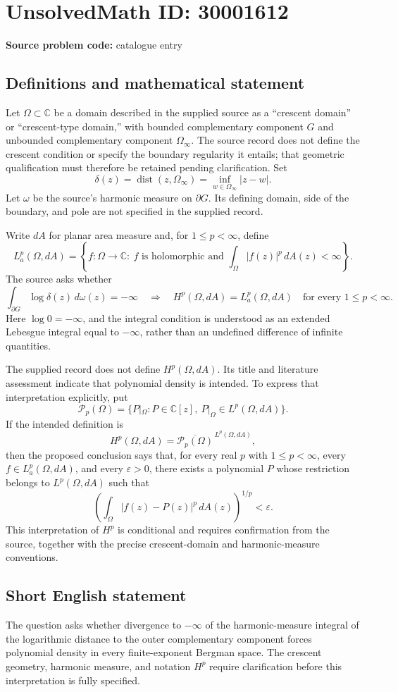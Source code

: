 \documentclass[11pt]{article}
\newcommand{\C}{\mathbb{C}}
\begin{document}
\section*{UnsolvedMath ID: 30001612}
\textbf{Source problem code:} catalogue entry
\subsection{Definitions and mathematical statement}
Let \(\Omega\subset\C\) be a domain described in the supplied source as a ``crescent domain'' or ``crescent-type domain,'' with bounded complementary component \(G\) and unbounded complementary component \(\Omega_\infty\). The source record does not define the crescent condition or specify the boundary regularity it entails; that geometric qualification must therefore be retained pending clarification. Set
\[
\delta(z)=\operatorname{dist}(z,\Omega_\infty)
=\inf_{w\in\Omega_\infty}|z-w|.
\]
Let \(\omega\) be the source's harmonic measure on \(\partial G\). Its defining domain, side of the boundary, and pole are not specified in the supplied record.

Write \(dA\) for planar area measure and, for \(1\leq p<\infty\), define
\[
L_a^p(\Omega,dA)=\left\{f:\Omega\to\C:\ f\text{ is holomorphic and }\int_\Omega |f(z)|^p\,dA(z)<\infty\right\}.
\]
The source asks whether
\[
\int_{\partial G}\log\delta(z)\,d\omega(z)=-\infty
\quad\Longrightarrow\quad
H^p(\Omega,dA)=L_a^p(\Omega,dA)
\quad\text{for every }1\leq p<\infty.
\]
Here \(\log 0=-\infty\), and the integral condition is understood as an extended Lebesgue integral equal to \(-\infty\), rather than an undefined difference of infinite quantities.

The supplied record does not define \(H^p(\Omega,dA)\). Its title and literature assessment indicate that polynomial density is intended. To express that interpretation explicitly, put
\[
\mathcal P_p(\Omega)=\{P|_\Omega:P\in\C[z],\ P|_\Omega\in L^p(\Omega,dA)\}.
\]
If the intended definition is
\[
H^p(\Omega,dA)=\overline{\mathcal P_p(\Omega)}^{\,L^p(\Omega,dA)},
\]
then the proposed conclusion says that, for every real \(p\) with \(1\leq p<\infty\), every \(f\in L_a^p(\Omega,dA)\), and every \(\varepsilon>0\), there exists a polynomial \(P\) whose restriction belongs to \(L^p(\Omega,dA)\) such that
\[
\left(\int_\Omega |f(z)-P(z)|^p\,dA(z)\right)^{1/p}<\varepsilon.
\]
This interpretation of \(H^p\) is conditional and requires confirmation from the source, together with the precise crescent-domain and harmonic-measure conventions.
\subsection{Short English statement}
The question asks whether divergence to \(-\infty\) of the harmonic-measure integral of the logarithmic distance to the outer complementary component forces polynomial density in every finite-exponent Bergman space. The crescent geometry, harmonic measure, and notation \(H^p\) require clarification before this interpretation is fully specified.
\end{document}
